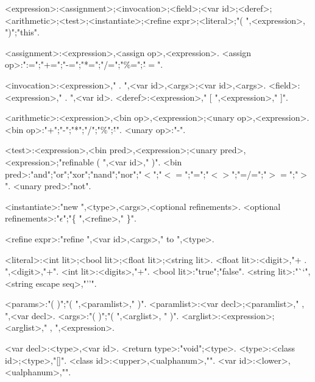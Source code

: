 \begin{grammar}
<expression>:<assignment>;<invocation>;<field>;<var id>;<deref>;<arithmetic>;<test>;<instantiate>;<refine expr>;<literal>;"( ",<expression>, ")";"this".

<assignment>:<expression>,<assign op>,<expression>.
<assign op>:":=";"+=";"-=";"*=";"/=";"\%=";"$\hat{}=$".

<invocation>:<expression>," . ",<var id>,<args>;<var id>,<args>.
<field>:<expression>," . ",<var id>.
<deref>:<expression>," [ ",<expression>," ]".

<arithmetic>:<expression>,<bin op>,<expression>;<unary op>,<expression>.
<bin op>:"+";"-";"*";"/";"\%";"$\hat{}$".
<unary op>:"-".

<test>:<expression>,<bin pred>,<expression>;<unary pred>,<expression>;"refinable ( ",<var id>," )".
<bin pred>:"and";"or";"xor";"nand";"nor";"$<$";"$<=$";"=";"$<>$";"=/=";"$>=$";"$>$".
<unary pred>:"not".

<instantiate>:"new ",<type>,<args>,<optional refinements>.
<optional refinements>:"$\epsilon$";"\{ ",<refine>,"{\small *} \}".

<refine expr>:"refine ",<var id>,<args>," to ",<type>.

<literal>:<int lit>;<bool lit>;<float lit>;<string lit>.
<float lit>:<digit>,"{\small +} . ",<digit>,"{\small +}".
<int lit>:<digits>,"{\small +}".
<bool lit>:"true";"false".
<string lit>:"``",<string escape seq>,"''".

<params>:"( )";"( ",<paramlist>," )".
<paramlist>:<var decl>;<paramlist>," , ",<var decl>.
<args>:"( )";"( ",<arglist>, " )".
<arglist>:<expression>;<arglist>," , ",<expression>.

<var decl>:<type>,<var id>.
<return type>:"void";<type>.
<type>:<class id>;<type>,"[]".
<class id>:<upper>,<ualphanum>,"{\small *}".
<var id>:<lower>,<ualphanum>,"{\small *}".

\end{grammar}
